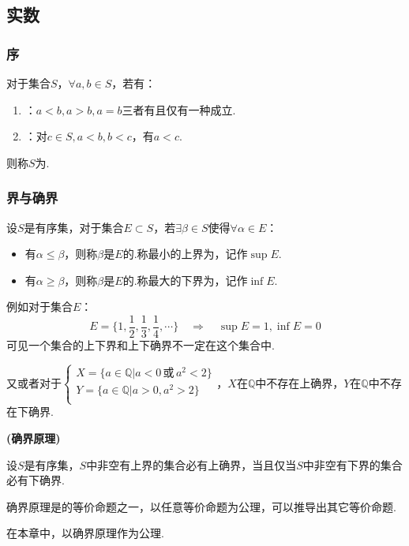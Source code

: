 \subsection{实数}
\subsubsection{序}
\begin{definition}
    对于集合$S$，$\forall a,b \in S$，若有：
    \begin{enumerate}[circ]
        \item {}：$a<b,a>b,a=b$三者有且仅有一种成立.
        \item {}：对$c \in S,a<b,b<c$，有$a<c$.
    \end{enumerate}
    则称$S$为.
\end{definition}

\subsubsection{界与确界}
\begin{definition}
    设$S$是有序集，对于集合$E \subset S$，若$\exists \beta \in S$使得$\forall \alpha \in E$：
    \begin{itemize}
        \item 有$\alpha \leqslant \beta$，则称$\beta$是$E$的.称最小的上界为，记作$\sup E$.
        \item 有$\alpha \geqslant \beta$，则称$\beta$是$E$的.称最大的下界为，记作$\inf E$.
    \end{itemize}
\end{definition}

例如对于集合$E$：
\[E=\{1,\frac{1}{2},\frac{1}{3},\frac{1}{4},\cdots\} \quad\Rightarrow\quad \sup E = 1, \inf E = 0\]
可见一个集合的上下界和上下确界不一定在这个集合中.

又或者对于$\begin{cases}
            X = \{a \in \mathbb{Q} | a<0 \,\text{或}\, a^2<2\} \\
            Y = \{a \in \mathbb{Q} | a>0 ,a^2>2\} \\
\end{cases}$，$X$在$\mathbb{Q}$中不存在上确界，$Y$在$\mathbb{Q}$中不存在下确界.

\begin{theorem}
    \textbf{(确界原理)}

    设$S$是有序集，$S$中非空有上界的集合必有上确界，当且仅当$S$中非空有下界的集合必有下确界.

    确界原理是的等价命题之一，以任意等价命题为公理，可以推导出其它等价命题.

    在本章中，以确界原理作为公理.
\end{theorem}

